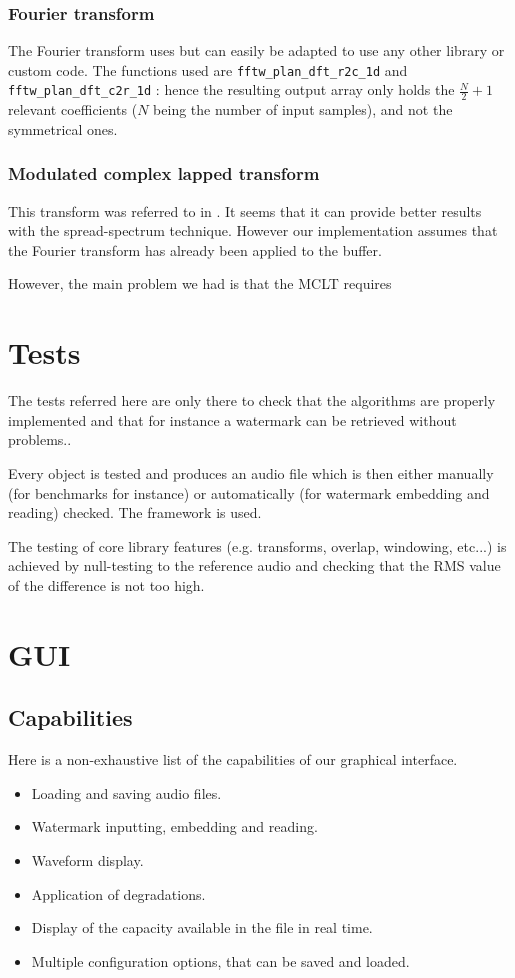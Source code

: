 \subsubsection{Fourier transform}
The Fourier transform uses  but can easily be adapted to use any other library or custom code.
The functions used are \texttt{fftw\_plan\_dft\_r2c\_1d} and \texttt{fftw\_plan\_dft\_c2r\_1d} : hence the resulting output array 
only holds the $\frac{N}{2} + 1$ relevant coefficients ($N$ being the number of input samples), and not the symmetrical ones.

\subsubsection{Modulated complex lapped transform}
This transform was referred to in \cite{malvar1999modulated}. It seems that it can provide better results with the spread-spectrum technique. However our implementation assumes that the Fourier transform has already been applied to the buffer.

However, the main problem we had is that the MCLT requires 

\section{Tests}
The tests referred here are only there to check that the algorithms are properly implemented and that for instance a watermark can be retrieved without problems..

Every object is tested and produces an audio file which is then either manually (for benchmarks for instance) or automatically (for watermark embedding and reading) checked. The  framework is used.

The testing of core library features (e.g. transforms, overlap, windowing, etc...) is achieved by null-testing to the reference audio and checking that the RMS value of the difference is not too high.
\section{GUI}
\subsection{Capabilities}
Here is a non-exhaustive list of the capabilities of our graphical interface.
\begin{itemize}
\item Loading and saving audio files.
\item Watermark inputting, embedding and reading.
\item Waveform display.
\item Application of degradations.
\item Display of the capacity available in the file in real time.
\item Multiple configuration options, that can be saved and loaded.
\end{itemize}
